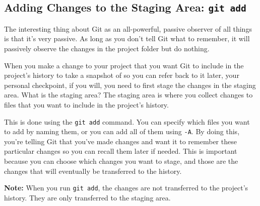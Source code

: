 \documentclass[
  letterpaper,
  DIV=11,
  numbers=noendperiod]{scrreprt}
\begin{document}
\hypertarget{adding-changes-to-the-staging-area-git-add}{%
\subsection{\texorpdfstring{Adding Changes to the Staging Area:
\texttt{git\ add}}{Adding Changes to the Staging Area: git add}}\label{adding-changes-to-the-staging-area-git-add}}

The interesting thing about Git as an all-powerful, passive observer of
all things is that it's very passive. As long as you don't tell Git what
to remember, it will passively observe the changes in the project folder
but do nothing.

When you make a change to your project that you want Git to include in
the project's history to take a snapshot of so you can refer back to it
later, your personal checkpoint, if you will, you need to first stage
the changes in the staging area. What is the staging area? The staging
area is where you collect changes to files that you want to include in
the project's history.

This is done using the \texttt{git\ add} command. You can specify which
files you want to add by naming them, or you can add all of them using
\texttt{-A}. By doing this, you're telling Git that you've made changes
and want it to remember these particular changes so you can recall them
later if needed. This is important because you can choose which changes
you want to stage, and those are the changes that will eventually be
transferred to the history.

\textbf{Note:} When you run \texttt{git\ add}, the changes are not
transferred to the project's history. They are only transferred to the
staging area.
\end{document}
